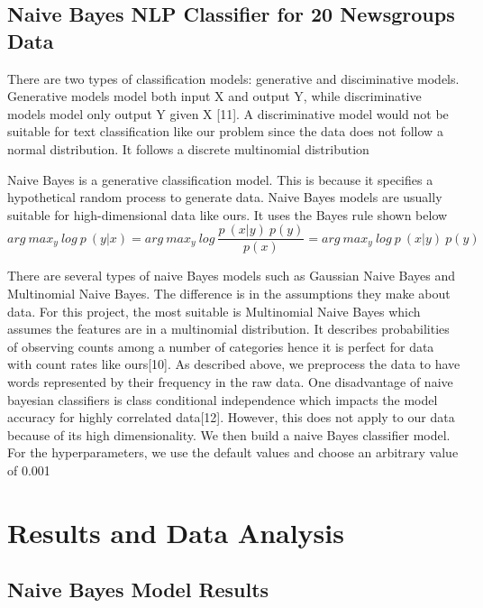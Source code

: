 \documentclass{article}
\begin{document}
\subsection{Naive Bayes NLP Classifier for 20 Newsgroups Data}

There are two types of classification models: generative and disciminative models. Generative models model both input X and output Y, while discriminative models model only output Y given X [11]. A discriminative model would not be suitable for text classification like our problem since the data does not follow a normal distribution. It follows a discrete multinomial distribution

Naive Bayes is a generative classification model. This is because it specifies a hypothetical random process to generate data. Naive Bayes models are usually suitable for high-dimensional data like ours. It uses the Bayes rule shown below
\begin{equation}
arg\:max_{y}\:log\:p\:(y|x) = arg\:max_{y}\:log\:\frac{p\:(x|y)\:p(y)} {p(x)} = arg\:max_{y}\:log\:p\:(x|y)\:p(y)
\end{equation} 

There are several types of naive Bayes models such as Gaussian Naive Bayes and Multinomial Naive Bayes. The difference is in the assumptions they make about data. For this project, the most suitable is Multinomial Naive Bayes which assumes the features are in a multinomial distribution. It describes probabilities of observing counts among a number of categories hence it is perfect for data with count rates like ours[10]. As described above, we preprocess the data to have words represented by their frequency in the raw data.  One disadvantage of naive bayesian classifiers is class conditional independence which impacts the model accuracy for highly correlated data[12]. However, this does not apply to our data because of its high dimensionality. We then build a naive Bayes classifier model. For the hyperparameters, we use the default values and choose an arbitrary value of 0.001 

\section{Results and Data Analysis}

\subsection{Naive Bayes Model Results}
\end{document}
